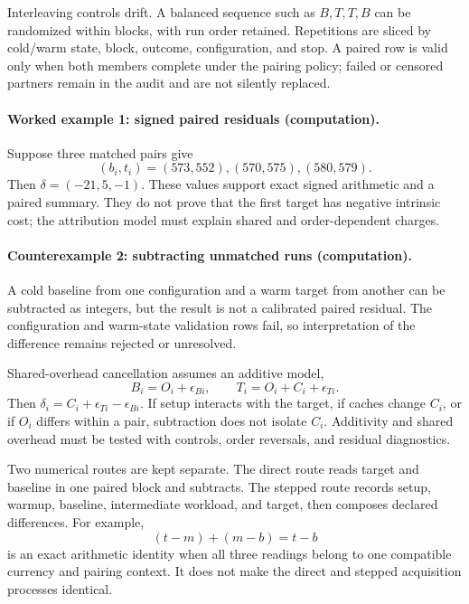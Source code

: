 Interleaving controls drift.  A balanced sequence such as \(B,T,T,B\) can be randomized within blocks, with run
order retained.  Repetitions are sliced by cold/warm state, block, outcome, configuration, and stop.  A paired row is
valid only when both members complete under the pairing policy; failed or censored partners remain in the audit and
are not silently replaced.

\paragraph{Worked example 1: signed paired residuals (computation).}
Suppose three matched pairs give
\[
                         (b_i,t_i)=(573,552),(570,575),(580,579).
\]
Then \(\delta=(-21,5,-1)\).  These values support exact signed arithmetic and a paired summary.  They do not prove
that the first target has negative intrinsic cost; the attribution model must explain shared and order-dependent
charges.

\paragraph{Counterexample 2: subtracting unmatched runs (computation).}
A cold baseline from one configuration and a warm target from another can be subtracted as integers, but the result
is not a calibrated paired residual.  The configuration and warm-state validation rows fail, so interpretation of the
difference remains rejected or unresolved.

Shared-overhead cancellation assumes an additive model,
\[
                         B_i=O_i+\epsilon_{Bi},\qquad
                         T_i=O_i+C_i+\epsilon_{Ti}.
\]
Then \(\delta_i=C_i+\epsilon_{Ti}-\epsilon_{Bi}\).  If setup interacts with the target, if caches change \(C_i\), or
if \(O_i\) differs within a pair, subtraction does not isolate \(C_i\).  Additivity and shared overhead must be tested
with controls, order reversals, and residual diagnostics.

Two numerical routes are kept separate.  The direct route reads target and baseline in one paired block and
subtracts.  The stepped route records setup, warmup, baseline, intermediate workload, and target, then composes
declared differences.  For example,
\[
                         (t-m)+(m-b)=t-b
\]
is an exact arithmetic identity when all three readings belong to one compatible currency and pairing context.
It does not make the direct and stepped acquisition processes identical.

